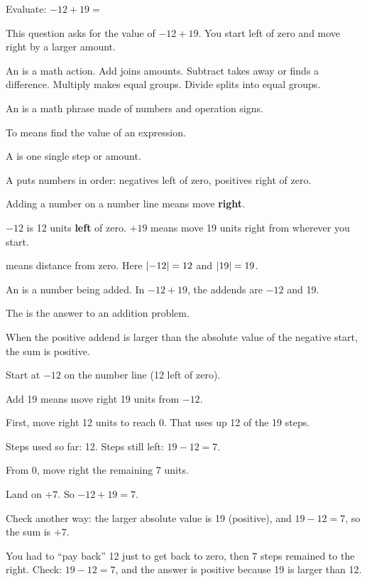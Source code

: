 Evaluate: $-12 + 19 =$


This question asks for the value of $-12 + 19$. You start left of zero and move right by a larger amount.

\begin{words}
  \item An is a math action. Add joins amounts. Subtract takes away or finds a difference. Multiply makes equal groups. Divide splits into equal groups.
  \item An is a math phrase made of numbers and operation signs.
  \item To means find the value of an expression.
  \item A is one single step or amount.
  \item A puts numbers in order: negatives left of zero, positives right of zero.
  \item Adding a number on a number line means move \textbf{right}.
  \item $-12$ is 12 units \textbf{left} of zero. $+19$ means move 19 units right from wherever you start.
  \item {}means distance from zero. Here $\left\lvert -12 \right\rvert = 12$ and $\left\lvert 19 \right\rvert = 19$.
  \item An is a number being added. In $-12 + 19$, the addends are $-12$ and 19.
  \item The is the answer to an addition problem.
  \item When the positive addend is larger than the absolute value of the negative start, the sum is positive.
\end{words}

\begin{steps}
  \item Start at $-12$ on the number line (12 left of zero).
  \item Add 19 means move right 19 units from $-12$.
  \item First, move right 12 units to reach 0. That uses up 12 of the 19 steps.
  \item Steps used so far: 12. Steps still left: $19 - 12 = 7$.
  \item From 0, move right the remaining 7 units.
  \item Land on $+7$. So $-12 + 19 = 7$.
  \item Check another way: the larger absolute value is 19 (positive), and $19 - 12 = 7$, so the sum is $+7$.
\end{steps}


You had to ``pay back'' 12 just to get back to zero, then 7 steps remained to the right. Check: $19 - 12 = 7$, and the answer is positive because 19 is larger than 12.
